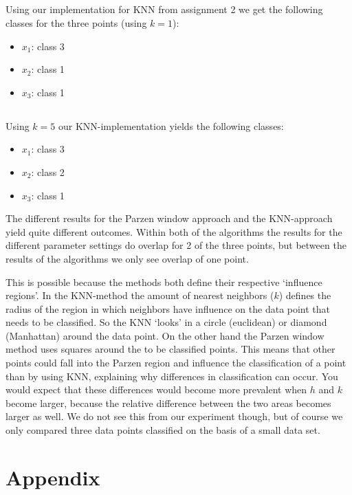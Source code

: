 \documentclass[10pt]{article}
\begin{document}
\subsection{}
Using our implementation for KNN from assignment 2 we get the following classes for the three points (using $k=1$):
\begin{itemize}
 \item $x_1$: class 3
 \item $x_2$: class 1
 \item $x_3$: class 1
\end{itemize}



\subsection{}
Using $k=5$ our KNN-implementation yields the following classes:
\begin{itemize}
 \item $x_1$: class 3
 \item $x_2$: class 2
 \item $x_3$: class 1
\end{itemize}

The different results for the Parzen window approach and the KNN-approach yield quite different outcomes. Within both of the algorithms the results for the different parameter settings do overlap for 2 of the three points, but between the results of the algorithms we only see overlap of one point. 

This is possible because the methods both define their respective `influence regions'. In the KNN-method the amount of nearest neighbors ($k$) defines the radius of the region in which neighbors have influence on the data point that needs to be classified. So the KNN `looks' in a circle (euclidean) or diamond (Manhattan) around the data point. On the other hand the Parzen window method uses squares around the to be classified points. This means that other points could fall into the Parzen region and influence the classification of a point than by using KNN, explaining why differences in classification can occur. You would expect that these differences would become more prevalent when $h$ and $k$ become larger, because the relative difference between the two areas becomes larger as well. We do not see this from our experiment though, but of course we only compared three data points classified on the basis of a small data set.

\section*{Appendix}






\end{document}
